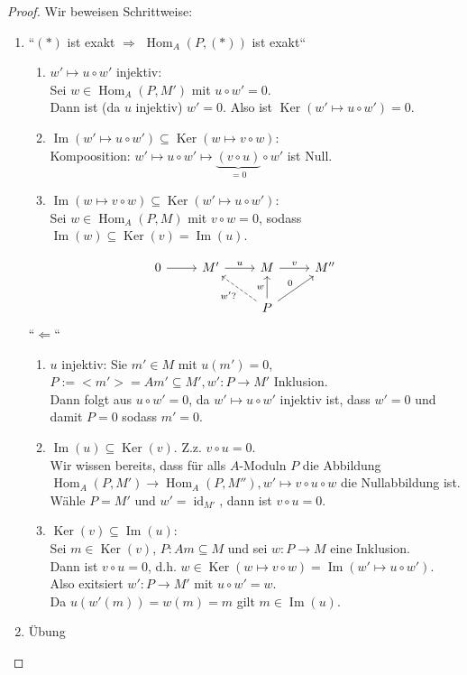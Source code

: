 \documentclass[10pt,a4paper]{article}
\newcommand{\Hom}{\operatorname{Hom}}
\newcommand{\Ker}{\ensuremath{\operatorname{Ker}}}
\newcommand{\Img}{\ensuremath{\operatorname{Im}}}
\newcommand{\id}{\operatorname{id}}
\theoremstyle{definition}
\theoremstyle{plain}
\theoremstyle{remark}
\begin{document}
\begin{proof}Wir beweisen Schrittweise:
	\begin{enumerate}
		\item ``$(*)$ ist exakt $\Rightarrow$ $\Hom_A(P,(*))$ ist exakt``
		\begin{enumerate}
			\item $w'\mapsto u\circ w'$ injektiv:\\
			Sei $w\in\Hom_A(P,M')$ mit $u\circ w'=0$.\\
			Dann ist (da $u$ injektiv) $w'=0$. Also ist $\Ker(w'\mapsto u\circ w')=0.$
			\item $\Img(w'\mapsto u\circ w')\subseteq\Ker(w\mapsto v\circ w)$:\\
			Kompoosition: $w'\mapsto u\circ w'\mapsto \underbrace{(v\circ u)}_{=0}\circ w'$ ist Null.
			\item $\Img(w\mapsto v\circ w)\subseteq\Ker(w'\mapsto u\circ w')$:\\
			Sei $w\in\Hom_A(P,M)$ mit $v\circ w=0$, sodass $\Img(w)\subseteq\Ker(v)=\Img(u)$.
		\end{enumerate}
		\[\begin{tikzcd}
			0\ar{r} & M'\ar{r}{u} & M\ar{r}{v} & M''\\
			&& P \ar[dashed]{lu}{w'?} \ar{u}{w} \ar{ru}{0}&
		\end{tikzcd}\]
		``$\Leftarrow$``
		\begin{enumerate}
			\item $u$ injektiv: Sie $m'\in M$ mit $u(m')=0$, $P:=<m'>=Am'\subseteq M',w':P\rightarrow M'$ Inklusion.\\
			Dann folgt aus $u\circ w'=0$, da $w'\mapsto u\circ w'$ injektiv ist, dass $w'=0$ und damit $P=0$ sodass $m'=0$.
			\item $\Img(u)\subseteq \Ker(v)$. Z.z. $v\circ u=0$.\\
			Wir wissen bereits, dass für alls $A$-Moduln $P$ die Abbildung $\Hom_A(P,M')\to\Hom_A(P,M''),w'\mapsto v\circ u\circ w$ die Nullabbildung ist.\\
			Wähle $P=M'$ und $w'=\id_{M'}$, dann ist $v\circ u=0$.
			\item $\Ker(v)\subseteq\Img(u)$:\\
			Sei $m\in \Ker(v)$, $P:Am\subseteq M$ und sei $w:P\rightarrow M$ eine Inklusion.\\
			Dann ist $v\circ u=0$, d.h. $w\in\Ker(w\mapsto v\circ w)=\Img(w'\mapsto u\circ w')$.\\
			Also exitsiert $w':P\rightarrow M'$ mit $u\circ w'=w$.\\
			Da $u(w'(m))=w(m)=m$ gilt $m\in\Img(u)$.
		\end{enumerate}
		\item  Übung
	\end{enumerate}
\end{proof}
\end{document}
